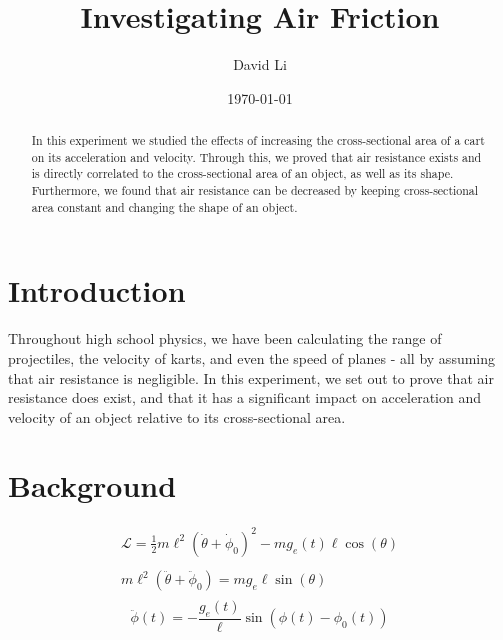 \documentclass[letterpaper,12pt]{article}
\begin{document}
\title{Investigating Air Friction}
\author{David Li}
\date{\today}
\maketitle

\begin{abstract}
  In this experiment we studied the effects of increasing the cross-sectional area of a cart on its acceleration and velocity.
  Through this, we proved that air resistance exists and is directly correlated to the cross-sectional area of an object, as well as its shape. Furthermore, we found that air resistance can be decreased by keeping cross-sectional area constant and changing the shape of an object.
\end{abstract}


\section{Introduction}

Throughout high school physics, we have been calculating the range of projectiles, the velocity of karts, and even the speed of planes - all by assuming that air resistance is negligible.
In this experiment, we set out to prove that air resistance does exist, and that it has a significant impact on acceleration and velocity of an object relative to its cross-sectional area.

\section{Background}

\begin{gather*}
   \mathcal{L} =  \frac{1}{2} m \ell^2 ( \dot{\theta}+\dot{\phi}_0)^2 - m g_e(t) \ell \cos(\theta)\\
   \\
   m\ell^2 (\ddot{\theta} + \ddot{\phi}_0) = mg_e\ell\sin(\theta)\\
\end{gather*}
\begin{equation}
   \ddot{\phi}(t) = -\frac{g_e(t)}{\ell} \sin\left(\phi(t)-\phi_0(t)\right)
   \label{Eq:equation1} %
\end{equation}

\begin{figure}[!h]
    \centering
\end{figure}
\end{document}
